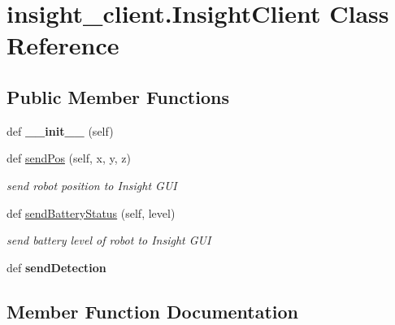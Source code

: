 \hypertarget{classinsight__client_1_1InsightClient}{}\section{insight\+\_\+client.\+Insight\+Client Class Reference}
\label{classinsight__client_1_1InsightClient}
\subsection*{Public Member Functions}
\begin{DoxyCompactItemize}
\item 
\hypertarget{classinsight__client_1_1InsightClient_a6d11f608dae02e685a1d0dd1d8568406}{}def {\bfseries \+\_\+\+\_\+init\+\_\+\+\_\+} (self)\label{classinsight__client_1_1InsightClient_a6d11f608dae02e685a1d0dd1d8568406}

\item 
def \hyperlink{classinsight__client_1_1InsightClient_a341da3412de138de10607a93656c4e49}{send\+Pos} (self, x, y, z)
\begin{DoxyCompactList}\small\item\em send robot position to Insight G\+U\+I \end{DoxyCompactList}\item 
def \hyperlink{classinsight__client_1_1InsightClient_a9b03273a011db2d6c88be123206fe975}{send\+Battery\+Status} (self, level)
\begin{DoxyCompactList}\small\item\em send battery level of robot to Insight G\+U\+I \end{DoxyCompactList}\item 
\hypertarget{classinsight__client_1_1InsightClient_a1687ed68fdf32c05c179a5226df7a8b4}{}def {\bfseries send\+Detection}\label{classinsight__client_1_1InsightClient_a1687ed68fdf32c05c179a5226df7a8b4}

\end{DoxyCompactItemize}


\subsection{Member Function Documentation}
\hypertarget{classinsight__client_1_1InsightClient_a9b03273a011db2d6c88be123206fe975}{}
